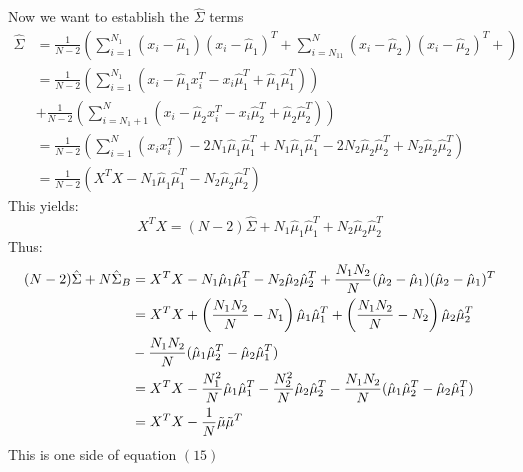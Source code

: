 Now we want to establish the $\hat{\Sigma}$ terms
\begin{align*}
    \hat{\Sigma} &= \frac{1}{N-2} \left( \sum_{i = 1}^{N_1} (x_i - \hat{\mu}_1)(x_i - \hat{\mu}_1)^T + \sum_{i = N_11}^{N} (x_i - \hat{\mu}_2)(x_i - \hat{\mu}_2)^T + \right) \\ 
    &= \frac{1}{N-2} \left( \sum_{i = 1}^{N_1} (x_i - \hat{\mu}_1 x_i^T - x_i \hat{\mu}_1^T  + \hat{\mu}_1 \hat{\mu}_1^T )\right) \\ & + \frac{1}{N-2} \left(\sum_{i = N_1+1}^{N} (x_i - \hat{\mu}_2 x_i^T - x_i \hat{\mu}_2^T  + \hat{\mu}_2 \hat{\mu}_2^T ) \right) \\
    &= \frac{1}{N-2} \left( \sum_{i = 1}^{N} (x_i x_i^T)- 2  N_1 \hat{\mu}_1 \hat{\mu}_1^T + N_1\hat{\mu}_1 \hat{\mu}_1^T - 2 N_2 \hat{\mu}_2 \hat{\mu}_2^T  + N_2\hat{\mu}_2 \hat{\mu}_2^T \right) \\
    &= \frac{1}{N-2} \left( X^T X - N_1\hat{\mu}_1 \hat{\mu}_1^T - N_2\hat{\mu}_2 \hat{\mu}_2^T \right)
\end{align*}
This yields:
$$ X^T X = (N-2) \hat{\Sigma} + N_1\hat{\mu}_1 \hat{\mu}_1^T + N_2\hat{\mu}_2 \hat{\mu}_2^T $$
Thus:
\begin{align*}
 (N-2) \hat{\Sigma} + N \hat{\Sigma}_B &= X^T X - N_1\hat{\mu}_1 \hat{\mu}_1^T - N_2\hat{\mu}_2  \hat{\mu}_2^T + \frac{N_1 N_2}{N}  (\hat{\mu}_2 - \hat{\mu}_1) (\hat{\mu}_2 - \hat{\mu}_1)^T\\
 &= X^T X + \left(\frac{N_1 N_2}{N} -  N_1\right) \hat{\mu}_1 \hat{\mu}_1^T + \left(\frac{N_1 N_2}{N} -  N_2\right)\hat{\mu}_2 \hat{\mu}_2^T \\ &- \frac{N_1 N_2}{N}  (\hat{\mu}_1 \hat{\mu}_2^T - \hat{\mu}_2 \hat{\mu}_1^T)\\
  &= X^T X - \frac{N_1^2}{N} \hat{\mu}_1 \hat{\mu}_1^T - \frac{N_2^2}{N}\hat{\mu}_2 \hat{\mu}_2^T - \frac{N_1 N_2}{N}  (\hat{\mu}_1 \hat{\mu}_2^T - \hat{\mu}_2 \hat{\mu}_1^T)\\ 
  &= X^T X - \frac{1}{N}\Tilde{\mu} \Tilde{\mu}^T
\end{align*}
This is one side of equation $(15)$

